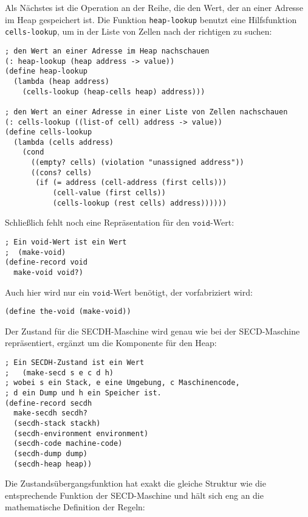 %
Als Nächstes ist die Operation an der Reihe, die den Wert, der an einer
Adresse im Heap gespeichert ist.  Die Funktion \lstinline{heap-lookup} benutzt
eine Hilfsfunktion \lstinline{cells-lookup}, um in der Liste von Zellen
nach der richtigen zu suchen:
%
\begin{lstlisting}
; den Wert an einer Adresse im Heap nachschauen
(: heap-lookup (heap address -> value))
(define heap-lookup
  (lambda (heap address)
    (cells-lookup (heap-cells heap) address)))

; den Wert an einer Adresse in einer Liste von Zellen nachschauen
(: cells-lookup ((list-of cell) address -> value))
(define cells-lookup
  (lambda (cells address)
    (cond
      ((empty? cells) (violation "unassigned address"))
      ((cons? cells)
       (if (= address (cell-address (first cells)))
           (cell-value (first cells))
           (cells-lookup (rest cells) address))))))
\end{lstlisting}
%
Schließlich fehlt noch eine Repräsentation für den $\mathtt{void}$-Wert:
%
\begin{lstlisting}
; Ein void-Wert ist ein Wert
;  (make-void)
(define-record void
  make-void void?)
\end{lstlisting}
%
Auch hier wird nur ein $\mathtt{void}$-Wert benötigt, der 
vorfabriziert wird:
%
\begin{lstlisting}
(define the-void (make-void))
\end{lstlisting}
%
Der Zustand für die SECDH-Maschine wird genau wie bei der
SECD-Maschine repräsentiert, ergänzt um die Komponente für den Heap:
%
\begin{lstlisting}
; Ein SECDH-Zustand ist ein Wert
;   (make-secd s e c d h)
; wobei s ein Stack, e eine Umgebung, c Maschinencode,
; d ein Dump und h ein Speicher ist.
(define-record secdh
  make-secdh secdh?
  (secdh-stack stackh)
  (secdh-environment environment)
  (secdh-code machine-code)
  (secdh-dump dump)
  (secdh-heap heap))
\end{lstlisting}
%
Die Zustandsübergangsfunktion hat exakt die
gleiche Struktur wie die entsprechende Funktion der SECD-Maschine und hält
sich eng an die mathematische Definition der Regeln:
%
